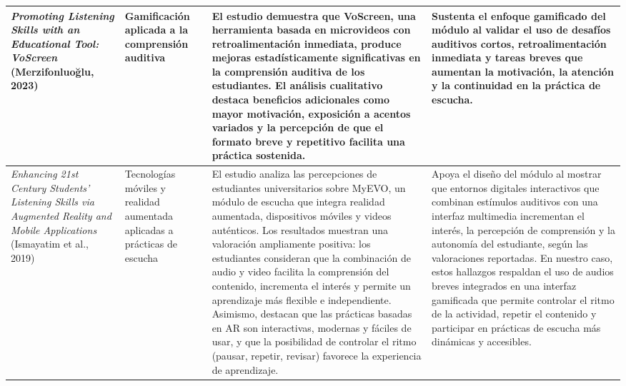\begin{center}
\begin{longtable}{| m{4.2cm} | m{3cm} | m{4.5cm} | m{4.5cm} |}
\textit{Promoting Listening Skills with an Educational Tool: VoScreen} (Merzifonluoğlu, 2023) \cite{merzifonluoglu_2023_voscreen} &
Gamificación aplicada a la comprensión auditiva &
El estudio demuestra que VoScreen, una herramienta basada en microvideos con retroalimentación inmediata, produce mejoras estadísticamente significativas en la comprensión auditiva de los estudiantes. El análisis cualitativo destaca beneficios adicionales como mayor motivación, exposición a acentos variados y la percepción de que el formato breve y repetitivo facilita una práctica sostenida. &
Sustenta el enfoque gamificado del módulo al validar el uso de desafíos auditivos cortos, retroalimentación inmediata y tareas breves que aumentan la motivación, la atención y la continuidad en la práctica de escucha. \\ \hline

\textit{Enhancing 21st Century Students’ Listening Skills via Augmented Reality and Mobile Applications} (Ismayatim et al., 2019) \cite{ismayatim_etal_2019_ar_listening} &
Tecnologías móviles y realidad aumentada aplicadas a prácticas de escucha &
El estudio analiza las percepciones de estudiantes universitarios sobre MyEVO, un módulo de escucha que integra realidad aumentada, dispositivos móviles y videos auténticos. Los resultados muestran una valoración ampliamente positiva: los estudiantes consideran que la combinación de audio y video facilita la comprensión del contenido, incrementa el interés y permite un aprendizaje más flexible e independiente. Asimismo, destacan que las prácticas basadas en AR son interactivas, modernas y fáciles de usar, y que la posibilidad de controlar el ritmo (pausar, repetir, revisar) favorece la experiencia de aprendizaje. &
Apoya el diseño del módulo al mostrar que entornos digitales interactivos que combinan estímulos auditivos con una interfaz multimedia incrementan el interés, la percepción de comprensión y la autonomía del estudiante, según las valoraciones reportadas. En nuestro caso, estos hallazgos respaldan el uso de audios breves integrados en una interfaz gamificada que permite controlar el ritmo de la actividad, repetir el contenido y participar en prácticas de escucha más dinámicas y accesibles. \\ \hline


\end{longtable}
\end{center}
